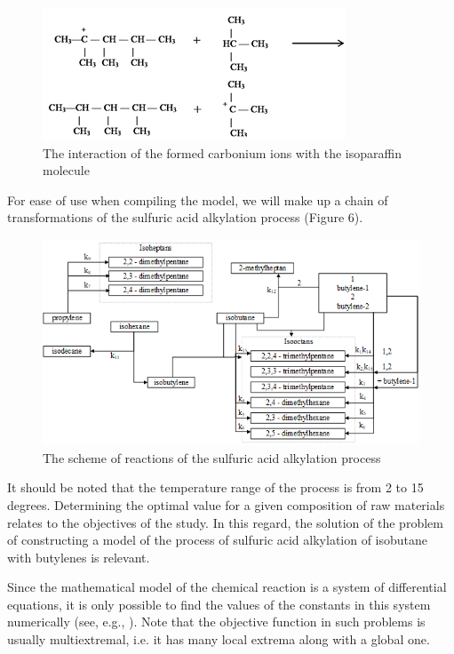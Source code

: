 \documentclass{svproc}
\begin{document}
\begin{figure}
\centering
\includegraphics[height=3.5 cm]{fig5.png}
\caption{The interaction of the formed carbonium ions with the isoparaffin molecule}
\label{fig5}
\end{figure}

For ease of use when compiling the model, we will make up a chain of transformations of the sulfuric acid alkylation process (Figure 6).

\begin{figure}
\centering
\includegraphics[height=6.5 cm]{fig6.png}
\centering
\caption{The scheme of reactions of the sulfuric acid alkylation process}
\label{fig6}
\end{figure}

It should be noted that the temperature range of the process is from 2 to 15 degrees. Determining the optimal value for a given composition of raw materials relates to the objectives of the study. In this regard, the solution of the problem of constructing a model of the process of sulfuric acid alkylation of isobutane with butylenes is relevant\cite{alkylation_mod}.

Since the mathematical model of the chemical reaction is a system of differential equations, it is only possible to find the values of the constants in this system numerically (see, e.g., \cite{Gubaydullin2021}). Note that the objective function in such problems is usually multiextremal, i.e. it has many local extrema along with a global one.
\end{document}
